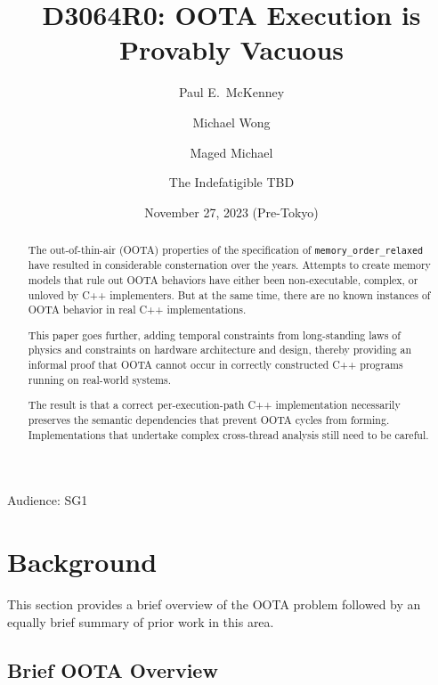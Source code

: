 \documentclass[10]{article}
\begin{document}
\title{D3064R0: OOTA Execution is Provably Vacuous}

\newcommand{\co}[1]{\lstinline[breaklines=yes,breakatwhitespace=yes]{#1}}

\author{
Paul E.~McKenney\\ \and
Michael Wong\\ \and
Maged Michael\\ \and
The Indefatigible TBD
}
\date{November 27, 2023 (Pre-Tokyo)}
\maketitle{}

Audience: SG1

\begin{abstract}
	The out-of-thin-air (OOTA) properties of the specification
	of \co{memory_order_relaxed} have resulted in considerable
	consternation over the years.
	Attempts to create memory models that rule out OOTA behaviors
	have either been non-executable, complex, or unloved by C++
	implementers.
	But at the same time, there are no known instances of OOTA
	behavior in real C++ implementations.

	This paper goes further, adding temporal constraints from
	long-standing laws of physics and constraints on hardware
	architecture and design, thereby providing an informal
	proof that OOTA cannot occur in correctly constructed C++
	programs running on real-world systems.

	The result is that a correct per-execution-path C++ implementation
	necessarily preserves the semantic dependencies that prevent
	OOTA cycles from forming.
	Implementations that undertake complex cross-thread analysis
	still need to be careful.
\end{abstract}

\section{Background}
\label{sec:Background}

This section provides a brief overview of the OOTA problem followed
by an equally brief summary of prior work in this area.

\subsection{Brief OOTA Overview}
\label{sec:Brief OOTA Overview}
\end{document}
